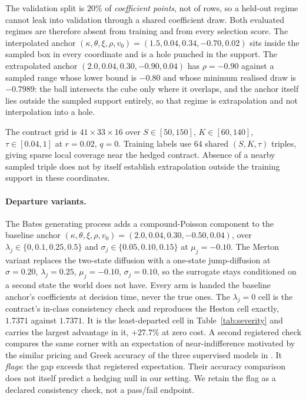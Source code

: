 \documentclass{article}
\begin{document}
The validation split is $20\%$ of \emph{coefficient points}, not of rows, so a
held-out regime cannot leak into validation through a shared coefficient draw. Both
evaluated regimes are therefore absent from training and from every selection score.
The interpolated anchor
$(\kappa, \theta, \xi, \rho, v_0) = (1.5, 0.04, 0.34, -0.70, 0.02)$ sits inside the
sampled box in every coordinate and is a hole punched in the support. The
extrapolated anchor $(2.0, 0.04, 0.30, -0.90, 0.04)$ has $\rho = -0.90$ against a
sampled range whose lower bound is $-0.80$ and whose minimum realised draw is
$-0.7989$: the ball intersects the cube only where it overlaps, and the anchor
itself lies outside the sampled support entirely, so that regime is extrapolation
and not interpolation into a hole.

The contract grid is $41 \times 33 \times 16$ over $S \in [50,150]$,
$K \in [60,140]$, $\tau \in [0.04,1]$ at $r = 0.02$, $q = 0$. Training labels use
$64$ shared $(S,K,\tau)$ triples, giving sparse local coverage near the hedged
contract. Absence of a nearby sampled triple does not by itself establish
extrapolation outside the training support in these coordinates.

\paragraph{Departure variants.} The Bates generating process adds a
compound-Poisson component \citep{bates1996jumps} to the baseline anchor
$(\kappa, \theta, \xi, \rho, v_0) = (2.0, 0.04, 0.30, -0.50, 0.04)$, over
$\lambda_j \in \{0, 0.1, 0.25, 0.5\}$ and $\sigma_j \in \{0.05, 0.10, 0.15\}$ at
$\mu_j = -0.10$. The Merton variant \citep{merton1976option} replaces the
two-state diffusion with a one-state jump-diffusion at $\sigma = 0.20$,
$\lambda_j = 0.25$, $\mu_j = -0.10$, $\sigma_j = 0.10$, so the surrogate stays
conditioned on a second state the world does not have. Every arm is handed the
baseline anchor's coefficients at decision time, never the true ones. The
$\lambda_j = 0$ cell is the contract's in-class consistency check and reproduces the
Heston cell exactly, $1.7371$ against $1.7371$. It is the least-departed cell in
Table~\ref{tab:severity} and carries the largest advantage in it, $+27.7\%$ at zero
cost. A second registered check compares the same corner with an expectation of
near-indifference motivated by the similar pricing and Greek accuracy of the three
supervised models in \citet{sakuma2026a}. It \emph{flags}: the gap exceeds that
registered expectation. Their accuracy comparison does not itself predict a
hedging null in our setting. We retain the flag as a declared consistency check,
not a pass/fail endpoint.
\end{document}
